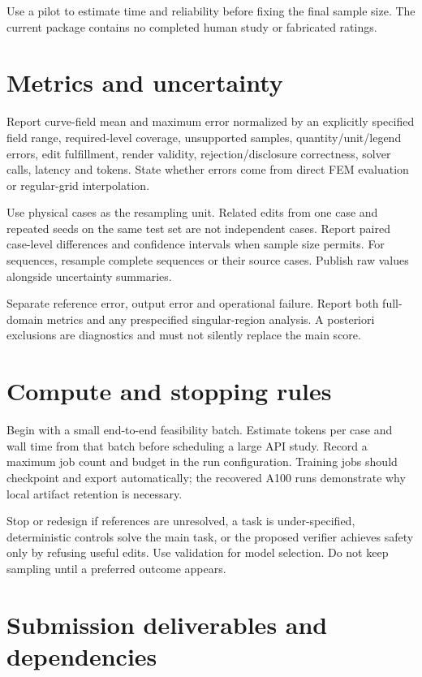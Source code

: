 \documentclass[
  11pt,
  a4paper,
]{article}
\begin{document}
Use a pilot to estimate time and reliability before fixing the final
sample size. The current package contains no completed human study or
fabricated ratings.

\section{Metrics and uncertainty}\label{metrics-and-uncertainty}

Report curve-field mean and maximum error normalized by an explicitly
specified field range, required-level coverage, unsupported samples,
quantity/unit/legend errors, edit fulfillment, render validity,
rejection/disclosure correctness, solver calls, latency and tokens.
State whether errors come from direct FEM evaluation or regular-grid
interpolation.

Use physical cases as the resampling unit. Related edits from one case
and repeated seeds on the same test set are not independent cases.
Report paired case-level differences and confidence intervals when
sample size permits. For sequences, resample complete sequences or their
source cases. Publish raw values alongside uncertainty summaries.

Separate reference error, output error and operational failure. Report
both full-domain metrics and any prespecified singular-region analysis.
A posteriori exclusions are diagnostics and must not silently replace
the main score.

\section{Compute and stopping rules}\label{compute-and-stopping-rules}

Begin with a small end-to-end feasibility batch. Estimate tokens per
case and wall time from that batch before scheduling a large API study.
Record a maximum job count and budget in the run configuration. Training
jobs should checkpoint and export automatically; the recovered A100 runs
demonstrate why local artifact retention is necessary.

Stop or redesign if references are unresolved, a task is
under-specified, deterministic controls solve the main task, or the
proposed verifier achieves safety only by refusing useful edits. Use
validation for model selection. Do not keep sampling until a preferred
outcome appears.

\section{Submission deliverables and
dependencies}\label{submission-deliverables-and-dependencies}
\end{document}
